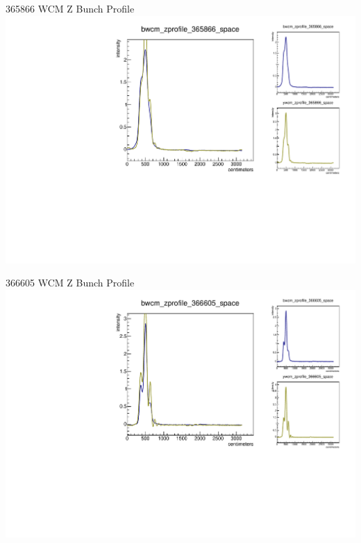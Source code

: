 \begin{frame}{365866 WCM Z Bunch Profile}
\includegraphics[width=\linewidth,height=\textheight,keepaspectratio]{../HourglassResults/figs/365866_wcm_zprofile.pdf}
\end{frame}

\begin{frame}{366605 WCM Z Bunch Profile}
\includegraphics[width=\linewidth,height=\textheight,keepaspectratio]{../HourglassResults/figs/366605_wcm_zprofile.pdf}
\end{frame}

